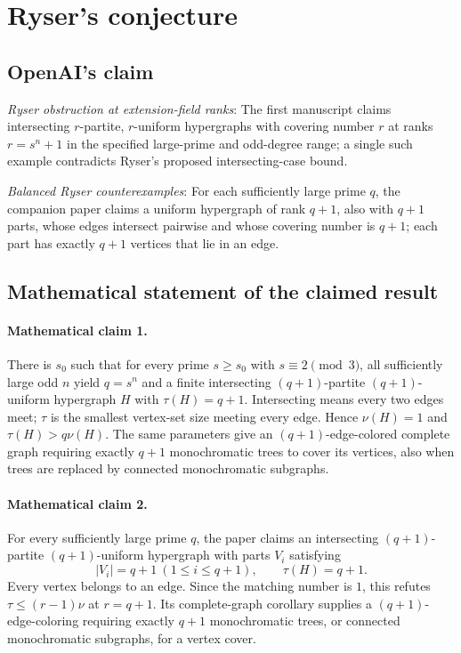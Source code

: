 \documentclass[11pt]{article}
\begin{document}
\section*{Ryser's conjecture}

\subsection{OpenAI's claim}
\textit{Ryser obstruction at extension-field ranks}: The first manuscript claims intersecting $r$-partite, $r$-uniform hypergraphs with covering number $r$ at ranks $r=s^n+1$ in the specified large-prime and odd-degree range; a single such example contradicts Ryser’s proposed intersecting-case bound.

\textit{Balanced Ryser counterexamples}: For each sufficiently large prime $q$, the companion paper claims a uniform hypergraph of rank $q+1$, also with $q+1$ parts, whose edges intersect pairwise and whose covering number is $q+1$; each part has exactly $q+1$ vertices that lie in an edge.

\subsection{Mathematical statement of the claimed result}
\paragraph{Mathematical claim 1.} There is $s_0$ such that for every prime $s\ge s_0$ with $s\equiv2\pmod3$, all sufficiently large odd $n$ yield $q=s^n$ and a finite intersecting $(q+1)$-partite $(q+1)$-uniform hypergraph $H$ with $\tau(H)=q+1$. Intersecting means every two edges meet; $\tau$ is the smallest vertex-set size meeting every edge. Hence $\nu(H)=1$ and $\tau(H)>q\nu(H)$. The same parameters give an $(q+1)$-edge-colored complete graph requiring exactly $q+1$ monochromatic trees to cover its vertices, also when trees are replaced by connected monochromatic subgraphs.

\paragraph{Mathematical claim 2.} For every sufficiently large prime $q$, the paper claims an intersecting $(q+1)$-partite $(q+1)$-uniform hypergraph with parts $V_i$ satisfying \[|V_i|=q+1\ (1\le i\le q+1),\qquad\tau(H)=q+1.\] Every vertex belongs to an edge. Since the matching number is $1$, this refutes $\tau\le(r-1)\nu$ at $r=q+1$. Its complete-graph corollary supplies a $(q+1)$-edge-coloring requiring exactly $q+1$ monochromatic trees, or connected monochromatic subgraphs, for a vertex cover.
\end{document}
